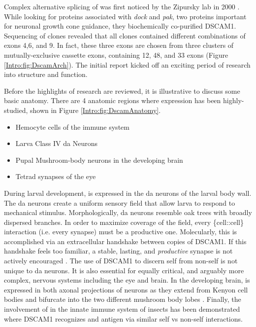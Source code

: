    Complex alternative splicing of\dscam{} was first noticed by the Zipursky lab in 2000 \citep{Schmucker2000}. While looking for proteins associated with \textit{dock} and \textit{pak}, two proteins important for neuronal growth cone guidance, they biochemically co-purified DSCAM1. Sequencing of \dscam{} clones revealed that all clones contained different combinations of exons 4,6, and 9. In fact, these three exons are chosen from three clusters of mutually-exclusive cassette exons, containing 12, 48, and 33 exons (Figure \ref{Intro:fig:DscamArch}). The initial report kicked off an exciting period of research into \dscam{} structure and function.

    Before the highlights of \dscam{} research are reviewed, it is illustrative to discuss some basic \flies{} anatomy. There are 4 anatomic regions where \dscam{} expression has been highly-studied, shown in Figure \ref{Intro:fig:DscamAnatomy}.

    \begin{itemize} \itemsep0.5pt \parskip0pt  %
      \singlespacing
      \item Hemocyte cells of the immune system
      \item Larva Class IV da Neurons 
      \item Pupal Mushroom-body neurons in the developing brain
      \item Tetrad synapses of the eye
      \end{itemize}

    During larval development, \dscam{} is expressed in the da neurons of the larval body wall. The da neurons create a uniform sensory field that allow larva to respond to mechanical stimulus. Morphologically, da neurons resemble oak trees with broadly dispersed branches. In order to maximize coverage of the field, every \{cell::cell\} interaction (i.e. every synapse) must be a productive one. Molecularly, this is accomplished via an extracellular handshake between copies of DSCAM1. If this handshake feels too familiar, a stable, lasting, and \textit{productive} synapse is not actively encouraged \citep{Wojtowicz2004}. The use of DSCAM1 to discern self from non-self is not unique to da neurons. It is also essential for equally critical, and arguably more complex, nervous systems including the eye and brain. In the developing brain, \dscam{} is expressed in both axonal projections of neurons as they extend from Kenyon cell bodies and bifurcate into the two different mushroom body lobes \citep{Zhan2004}. Finally, the involvement of \dscam{} in the innate immune system of insects has been demonstrated \citep{Watson2005,Dong2006} where DSCAM1 recognizes and antigen via similar self vs non-self interactions.

